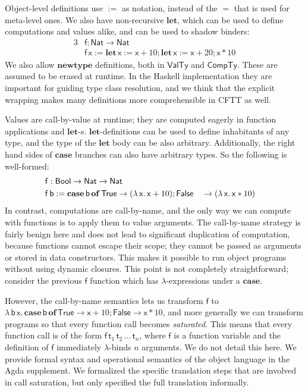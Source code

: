 \documentclass[acmsmall,screen,review,anonymous]{acmart}
\newcommand{\msf}[1]{{\mathsf{#1}}}
\newcommand{\mbf}[1]{{\mathbf{#1}}}
\newcommand{\lam}{\lambda\,}
\newcommand{\of}{\mbf{of}\,}
\newcommand{\letdef}{\mbf{let\,}}
\newcommand{\vb}{\mathsf{b}}
\newcommand{\vx}{\mathsf{x}}
\newcommand{\vf}{\mathsf{f}}
\newcommand{\vt}{\mathsf{t}}
\newcommand{\Bool}{\msf{Bool}}
\newcommand{\case}{\mbf{case\,}}
\newcommand{\VTy}{\msf{ValTy}}
\newcommand{\CTy}{\msf{CompTy}}
\newcommand{\True}{\msf{True}}
\newcommand{\False}{\msf{False}}
\newcommand{\Nat}{\msf{Nat}}
\theoremstyle{remark}
\begin{document}
Object-level definitions use $:=$ as notation, instead of the $=$ that is used
for meta-level ones. We also have non-recursive $\mbf{let}$, which can be used
to define computations and values alike, and can be used to shadow binders:
\begin{alignat*}{3}
  &\vf : \Nat \to \Nat\\
  &\vf\,\vx := \letdef \vx := \vx + 10; \letdef \vx := \vx + 20; \vx * 10
\end{alignat*}
We also allow $\mbf{newtype}$ definitions, both in $\VTy$ and $\CTy$. These are
assumed to be erased at runtime. In the Haskell implementation they are
important for guiding type class resolution, and we think that the explicit
wrapping makes many definitions more comprehensible in CFTT as well.

Values are call-by-value at runtime; they are computed eagerly in function
applications and $\mbf{let}$-s. $\mbf{let}$-definitions can be used to define
inhabitants of any type, and the type of the $\mbf{let}$ body can be also
arbitrary. Additionally, the right hand sides of $\mbf{case}$ branches can also
have arbitrary types. So the following is well-formed:
\begin{alignat*}{3}
  &\vf : \mathrlap{\Bool \to \Nat \to \Nat}\\
  &\vf\,\vb := \case \vb\,\of \True \to (\lam \vx.\, \vx + 10); \False &&\to (\lam \vx.\, \vx * 10)
\end{alignat*}
In contrast, computations are call-by-name, and the only way we can compute with
functions is to apply them to value arguments. The call-by-name strategy is
fairly benign here and does not lead to significant duplication of computation,
because functions cannot escape their scope; they cannot be passed as arguments
or stored in data constructors. This makes it possible to run object programs
without using dynamic closures. This point is not completely straightforward;
consider the previous $\vf$ function which has $\lambda$-expressions under a
$\mbf{case}$.

However, the call-by-name semantics lets us transform $\vf$ to $\lam
\vb\,\vx.\,\case \vb\,\of \True \to \vx + 10; \False \to \vx * 10$, and more
generally we can transform programs so that every function call becomes
\emph{saturated}. This means that every function call is of the form
$\vf\,\vt_1\,\vt_2\,...\,\vt_n$, where $\vf$ is a function variable and the
definition of $\vf$ immediately $\lambda$-binds $n$ arguments. We do not detail
this here. We provide formal syntax and operational semantics of the object
language in the Agda supplement. We formalized the specific translation steps
that are involved in call saturation, but only specified the full translation
informally.
\end{document}
